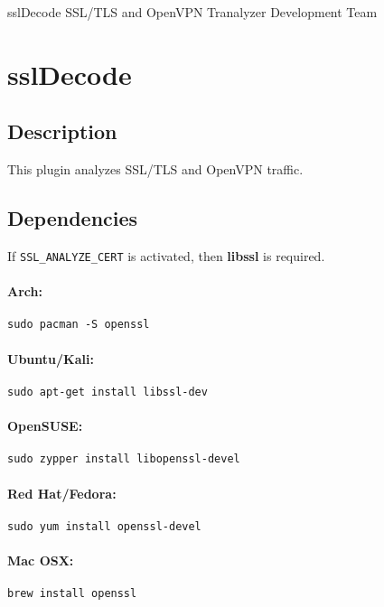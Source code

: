 \documentclass[documentation]{subfiles}
\begin{document}
\trantitle
    {sslDecode}
    {SSL/TLS and OpenVPN}
    {Tranalyzer Development Team}

\section{sslDecode}\label{s:sslDecode}

\subsection{Description}
This plugin analyzes SSL/TLS and OpenVPN traffic.

\subsection{Dependencies}
If {\tt SSL\_ANALYZE\_CERT} is activated, then {\bf libssl} is required.
\paragraph{Arch:} {\tt sudo pacman -S openssl}
\paragraph{Ubuntu/Kali:} {\tt sudo apt-get install libssl-dev}
\paragraph{OpenSUSE:} {\tt sudo zypper install libopenssl-devel}
\paragraph{Red Hat/Fedora:} {\tt sudo yum install openssl-devel}
\paragraph{Mac OSX:} {\tt brew install openssl}
\end{document}
